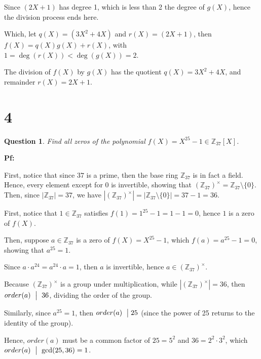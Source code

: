 \documentclass{article}
\newtheorem{question}{Question}
\begin{document}
\hfill

\hfill

Since $(2X+1)$ has degree 1, which is less than 2 the degree of $g(X)$, hence the division process ends here.

Which, let $q(X)=(3X^2+4X)$ and $r(X)=(2X+1)$, then $f(X)=q(X)g(X)+r(X)$, with $1=\deg(r(X))< \deg(g(X))=2$.

The division of $f(X)$ by $g(X)$ has the quotient $q(X)=3X^2+4X$, and remainder $r(X)=2X+1$.

\break

\section*{4}
\begin{myBox}[]{}
    \begin{question}
        Find all zeros of the polynomial $f(X)=X^{25}-1 \in \mathbb{Z}_{37}[X]$.
    \end{question}
\end{myBox}

\textbf{Pf:}

First, notice that since $37$ is a prime, then the base ring $\mathbb{Z}_{37}$ is in fact a field.
Hence, every element except for $0$ is invertible, showing that $(\mathbb{Z}_{37})^\times = \mathbb{Z}_{37}\setminus\{0\}$.
Then, since $|\mathbb{Z}_{37}| = 37$, we have $|(\mathbb{Z}_{37})^\times| = |\mathbb{Z}_{37}\setminus\{0\}| = 37-1 = 36$.

\hfill

First, notice that $1\in\mathbb{Z}_{37}$ satisfies $f(1)=1^25-1 = 1-1 = 0$, hence $1$ is a zero of $f(X)$.

\hfill

Then, suppose $a\in\mathbb{Z}_{37}$ is a zero of $f(X)=X^{25}-1$, which $f(a)=a^{25}-1 = 0$, showing that $a^{25}=1$.

Since $a\cdot a^{24} = a^{24}\cdot a=1$, then $a$ is invertible, hence $a\in(\mathbb{Z}_{37})^\times$.

Because $(\mathbb{Z}_{37})^\times$ is a group under multiplication, while $|(\mathbb{Z}_{37})^\times| = 36$, then $order(a)\ \bigm |\ 36$, 
dividing the order of the group.

Similarly, since $a^{25}=1$, then $order(a)\ \bigm | 25$ (since the power of 25 returns to the identity of the group).

Hence, $order(a)$ must be a common factor of $25 = 5^2$ and $36 = 2^2\cdot 3^2$, which $order(a)\ \bigm |\ \gcd(25,36)=1$.
\end{document}
